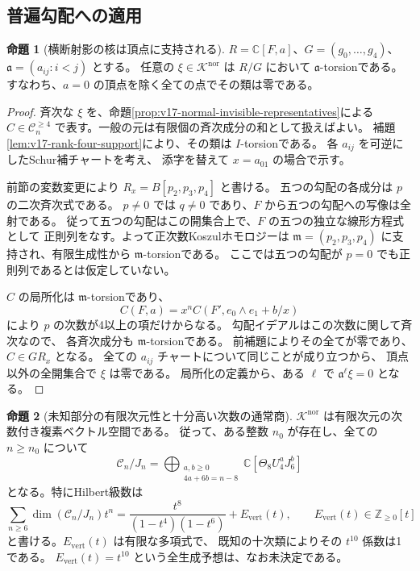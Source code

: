 \documentclass[a4paper,11pt]{ltjsarticle}
\theoremstyle{definition}
\newtheorem{theorem}{命題}[section]
\begin{document}
\subsection{普遍勾配への適用}

\begin{theorem}[横断射影の核は頂点に支持される]
\label{thm:v17-normal-kernel-vertex-support}
$R=\mathbb C[F,a]$、$G=(g_0,\ldots,g_4)$、
$\mathfrak a=(a_{ij}:i<j)$ とする。
任意の $\xi\in\mathcal K^{\mathrm{nor}}$ は $R/G$ において
$\mathfrak a$-torsionである。
すなわち、$a=0$ の頂点を除く全ての点でその類は零である。
\end{theorem}

\begin{proof}
斉次な $\xi$ を、命題\ref{prop:v17-normal-invisible-representatives}による
$C\in\mathcal C_n^{\ge4}$ で表す。一般の元は有限個の斉次成分の和として扱えばよい。
補題\ref{lem:v17-rank-four-support}により、その類は $I$-torsionである。
各 $a_{ij}$ を可逆にしたSchur補チャートを考え、
添字を替えて $x=a_{01}$ の場合で示す。

前節の変数変更により $R_x=B[p_2,p_3,p_4]$ と書ける。
五つの勾配の各成分は $p$ の二次斉次式である。
$p\ne0$ では $q\ne0$ であり、$F$ から五つの勾配への写像は全射である。
従って五つの勾配はこの開集合上で、$F$ の五つの独立な線形方程式として
正則列をなす。よって正次数Koszulホモロジーは
$\mathfrak m=(p_2,p_3,p_4)$ に支持され、有限生成性から
$\mathfrak m$-torsionである。
ここでは五つの勾配が $p=0$ でも正則列であるとは仮定していない。

$C$ の局所化は $\mathfrak m$-torsionであり、
\[
 C(F,a)=x^nC(F',e_0\wedge e_1+b/x)
\]
により $p$ の次数が4以上の項だけからなる。
勾配イデアルはこの次数に関して斉次なので、
各斉次成分も $\mathfrak m$-torsionである。
前補題によりその全てが零であり、$C\in GR_x$ となる。
全ての $a_{ij}$ チャートについて同じことが成り立つから、
頂点以外の全開集合で $\xi$ は零である。
局所化の定義から、ある $\ell$ で $\mathfrak a^\ell\xi=0$ となる。
\end{proof}

\begin{theorem}[未知部分の有限次元性と十分高い次数の通常商]
\label{thm:v17-finite-normal-kernel}
$\mathcal K^{\mathrm{nor}}$ は有限次元の次数付き複素ベクトル空間である。
従って、ある整数 $n_0$ が存在し、全ての $n\ge n_0$ について
\begin{equation}\label{eq:v17-eventual-contact-quotient}
 \mathcal C_n/J_n
  =\bigoplus_{\substack{a,b\ge0\\4a+6b=n-8}}
      \mathbb C[\Theta_8U_4^aJ_6^b]
\end{equation}
となる。特にHilbert級数は
\begin{equation}\label{eq:v17-contact-hilbert-finite-correction}
 \sum_{n\ge6}\dim(\mathcal C_n/J_n)t^n
   =\frac{t^8}{(1-t^4)(1-t^6)}+E_{\mathrm{vert}}(t),
 \qquad E_{\mathrm{vert}}(t)\in\mathbb Z_{\ge0}[t]
\end{equation}
と書ける。$E_{\mathrm{vert}}(t)$ は有限な多項式で、
既知の十次類によりその $t^{10}$ 係数は1である。
$E_{\mathrm{vert}}(t)=t^{10}$ という全生成予想は、なお未決定である。
\end{theorem}
\end{document}
